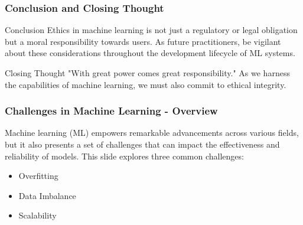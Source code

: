 \documentclass[aspectratio=169]{beamer}
\begin{document}
\begin{frame}[fragile]
    \frametitle{Conclusion and Closing Thought}
    \begin{block}{Conclusion}
        Ethics in machine learning is not just a regulatory or legal obligation but a moral responsibility towards users. As future practitioners, be vigilant about these considerations throughout the development lifecycle of ML systems.
    \end{block}
    
    \begin{block}{Closing Thought}
        "With great power comes great responsibility." As we harness the capabilities of machine learning, we must also commit to ethical integrity.
    \end{block}
\end{frame}

\begin{frame}[fragile]
    \frametitle{Challenges in Machine Learning - Overview}
    Machine learning (ML) empowers remarkable advancements across various fields, but it also presents a set of challenges that can impact the effectiveness and reliability of models. This slide explores three common challenges:
    \begin{itemize}
        \item Overfitting
        \item Data Imbalance
        \item Scalability
    \end{itemize}
\end{frame}
\end{document}
